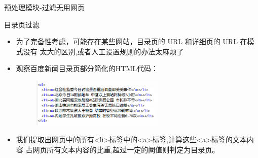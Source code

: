 \begin{frame}[label=sec-2-3]{预处理模块-过滤无用网页}  
  \begin{block}{目录页过滤}
    \begin{itemize}
    \item 为了完备性考虑，可能存在某些网站，目录页的 URL 和详细页的 URL 在模式没有
      太大的区别,或者人工设置规则的办法太麻烦了
     \item<2-> 观察百度新闻目录页部分简化的HTML代码：
       \begin{figure}[h]
        \centering
        \includegraphics[width=0.6\textwidth]{baidunews}
      \end{figure}    
    \item<3-> 我们提取出网页中的所有<li>标签中的<a>标签,计算这些<a>标签的文本内容
      占网页所有文本内容的比重,超过一定的阈值则判定为目录页。
    \end{itemize}
\end{block}
\end{frame}
